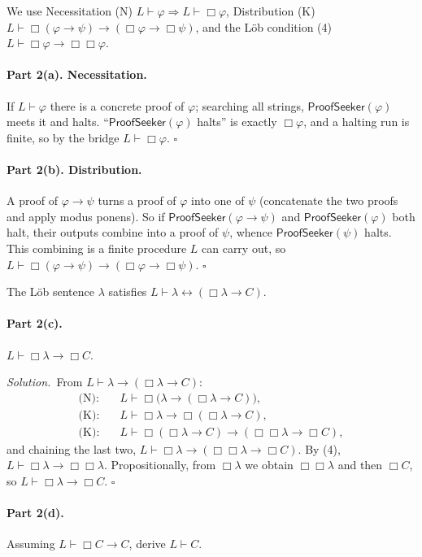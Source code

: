 \documentclass[11pt]{article}
\newcommand{\proves}{\vdash}
\newcommand{\PS}{\mathsf{ProofSeeker}}
\newcommand{\bx}{\Box}
\newcommand{\soln}{\medskip\noindent\textit{Solution.}\ }
\renewcommand{\qed}{\ensuremath{\square}}
\begin{document}
\begin{solution}[ex:lob]
We use Necessitation (N) $L\proves\varphi\Rightarrow L\proves\bx\varphi$, Distribution (K) $L\proves\bx(\varphi\to\psi)\to(\bx\varphi\to\bx\psi)$, and the L\"ob condition (4) $L\proves\bx\varphi\to\bx\bx\varphi$.

\paragraph{Part 2(a). Necessitation.} If $L\proves\varphi$ there is a concrete proof of $\varphi$; searching all strings, $\PS(\varphi)$ meets it and halts. ``$\PS(\varphi)$ halts'' is exactly $\bx\varphi$, and a halting run is finite, so by the bridge $L\proves\bx\varphi$. \qed

\paragraph{Part 2(b). Distribution.} A proof of $\varphi\to\psi$ turns a proof of $\varphi$ into one of $\psi$ (concatenate the two proofs and apply modus ponens). So if $\PS(\varphi\to\psi)$ and $\PS(\varphi)$ both halt, their outputs combine into a proof of $\psi$, whence $\PS(\psi)$ halts. This combining is a finite procedure $L$ can carry out, so $L\proves\bx(\varphi\to\psi)\to(\bx\varphi\to\bx\psi)$. \qed

\medskip
The L\"ob sentence $\lambda$ satisfies $L\proves\lambda\leftrightarrow(\bx\lambda\to C)$.

\paragraph{Part 2(c).} $L\proves\bx\lambda\to\bx C$.

\soln From $L\proves\lambda\to(\bx\lambda\to C)$:
\begin{align*}
\text{(N):}\quad & L\proves \bx\!\big(\lambda\to(\bx\lambda\to C)\big),\\
\text{(K):}\quad & L\proves \bx\lambda\to\bx(\bx\lambda\to C), \\
\text{(K):}\quad & L\proves \bx(\bx\lambda\to C)\to(\bx\bx\lambda\to\bx C),
\end{align*}
and chaining the last two, $L\proves\bx\lambda\to(\bx\bx\lambda\to\bx C)$. By (4), $L\proves\bx\lambda\to\bx\bx\lambda$. Propositionally, from $\bx\lambda$ we obtain $\bx\bx\lambda$ and then $\bx C$, so $L\proves\bx\lambda\to\bx C$. \qed

\paragraph{Part 2(d).} Assuming $L\proves\bx C\to C$, derive $L\proves C$.


\end{solution}
\end{document}
